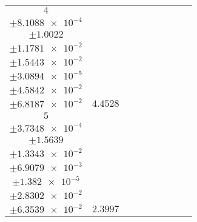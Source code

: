 \documentclass[8pt]{article}
\begin{document}
\begin{longtable}[l]{c c c c c c c c c}
$\num{4}$ & \begin{tabular}[c]{@{}c@{}}$\num{7.0232e-2}$ \\ $\pm\num{8.1088e-4}$\end{tabular} & \begin{tabular}[c]{@{}c@{}}$\num{-8.1009}$ \\ $\pm\num{1.0022}$\end{tabular} & \begin{tabular}[c]{@{}c@{}}$\num{1.0021}$ \\ $\pm\num{1.1781e-2}$\end{tabular} & \begin{tabular}[c]{@{}c@{}}$\num{2.9578e+3}$ \\ $\pm\num{1.5443e-2}$\end{tabular} & \begin{tabular}[c]{@{}c@{}}$\num{5.9172}$ \\ $\pm\num{3.0894e-5}$\end{tabular} & \begin{tabular}[c]{@{}c@{}}$\num{4.3936}$ \\ $\pm\num{4.5842e-2}$\end{tabular} & \begin{tabular}[c]{@{}c@{}}$\num{6.8951}$ \\ $\pm\num{6.8187e-2}$\end{tabular} & $\num{4.4528}$\\
$\num{5}$ & \begin{tabular}[c]{@{}c@{}}$\num{3.3131e-2}$ \\ $\pm\num{3.7348e-4}$\end{tabular} & \begin{tabular}[c]{@{}c@{}}$\num{3.0082}$ \\ $\pm\num{1.5639}$\end{tabular} & \begin{tabular}[c]{@{}c@{}}$\num{5.6382}$ \\ $\pm\num{1.3343e-2}$\end{tabular} & \begin{tabular}[c]{@{}c@{}}$\num{2.9624e+3}$ \\ $\pm\num{6.9079e-3}$\end{tabular} & \begin{tabular}[c]{@{}c@{}}$\num{5.9265}$ \\ $\pm\num{1.382e-5}$\end{tabular} & \begin{tabular}[c]{@{}c@{}}$\num{2.6329}$ \\ $\pm\num{2.8302e-2}$\end{tabular} & \begin{tabular}[c]{@{}c@{}}$\num{4.7974}$ \\ $\pm\num{6.3539e-2}$\end{tabular} & $\num{2.3997}$\\

\end{longtable}
\end{document}
